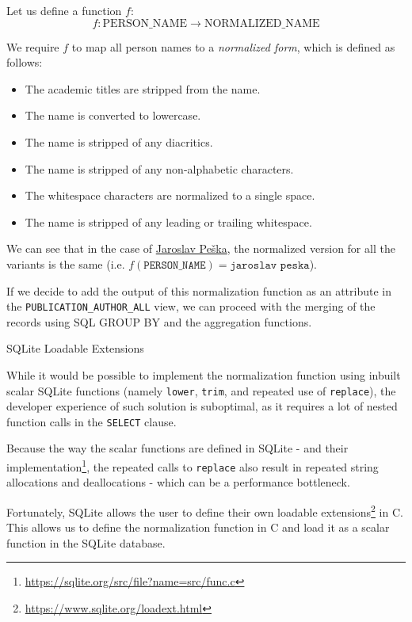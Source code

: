 Let us define a function $f$:
$$f: \text{PERSON\_NAME} \to \text{NORMALIZED\_NAME}$$

We require $f$ to map all person names to a \textit{normalized form}, which is defined as follows:
\begin{itemize}
    \item The academic titles are stripped from the name.
    \item The name is converted to lowercase.
    \item The name is stripped of any diacritics.
    \item The name is stripped of any non-alphabetic characters.
    \item The whitespace characters are normalized to a single space.
    \item The name is stripped of any leading or trailing whitespace.
\end{itemize}

We can see that in the case of \hyperref[fig:jaroslav-peska]{Jaroslav Peška}, 
the normalized version for all the variants is the same (i.e. $f(\texttt{PERSON\_NAME}) = \texttt{jaroslav peska}$).

If we decide to add the output of this normalization function as an attribute in the \texttt{PUBLICATION\_AUTHOR\_ALL} view,
we can proceed with the merging of the records using SQL GROUP BY and the aggregation functions.

\begin{mybox}
    {SQLite Loadable Extensions}

    While it would be possible to implement the normalization function using inbuilt scalar SQLite functions (namely \texttt{lower}, \texttt{trim},
    and repeated use of \texttt{replace}), the developer experience of such solution is suboptimal, as it requires a lot of nested function calls
    in the \texttt{SELECT} clause.

    Because the way the scalar functions are defined in SQLite - and their implementation\footnote{\url{https://sqlite.org/src/file?name=src/func.c}}, 
    the repeated calls to \texttt{replace} also result in repeated string allocations and deallocations - which can be a performance bottleneck.

    Fortunately, SQLite allows the user to define their own loadable extensions\footnote{\url{https://www.sqlite.org/loadext.html}} in C.
    This allows us to define the normalization function in C and load it as a scalar function in the SQLite database.
\end{mybox}

